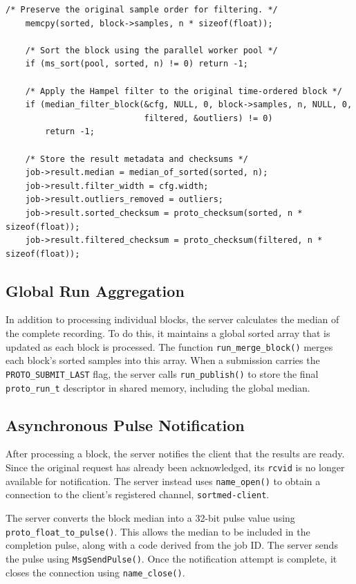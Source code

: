 \documentclass[12pt,a4paper,oneside]{report}
\begin{document}
\begin{lstlisting}[caption={Sorting, filtering, and preparing the block results}, label={lst:server-process}]
    /* Preserve the original sample order for filtering. */
    memcpy(sorted, block->samples, n * sizeof(float));

    /* Sort the block using the parallel worker pool */
    if (ms_sort(pool, sorted, n) != 0) return -1;

    /* Apply the Hampel filter to the original time-ordered block */
    if (median_filter_block(&cfg, NULL, 0, block->samples, n, NULL, 0,
                            filtered, &outliers) != 0)
        return -1;

    /* Store the result metadata and checksums */
    job->result.median = median_of_sorted(sorted, n);
    job->result.filter_width = cfg.width;
    job->result.outliers_removed = outliers;
    job->result.sorted_checksum = proto_checksum(sorted, n * sizeof(float));
    job->result.filtered_checksum = proto_checksum(filtered, n * sizeof(float));
\end{lstlisting}

\subsection{Global Run Aggregation}

In addition to processing individual blocks, the server calculates the median of the complete recording. To do this, it maintains a global sorted array that is updated as each block is processed. The function \texttt{run\_merge\_block()} merges each block's sorted samples into this array. When a submission carries the \texttt{PROTO\_SUBMIT\_LAST} flag, the server calls \texttt{run\_publish()} to store the final \texttt{proto\_run\_t} descriptor in shared memory, including the global median.

\subsection{Asynchronous Pulse Notification}

After processing a block, the server notifies the client that the results are ready. Since the original request has already been acknowledged, its \texttt{rcvid} is no longer available for notification. The server instead uses \texttt{name\_open()} to obtain a connection to the client's registered channel, \texttt{sortmed-client}.

The server converts the block median into a 32-bit pulse value using \texttt{proto\_float\_to\_pulse()}. This allows the median to be included in the completion pulse, along with a code derived from the job ID. The server sends the pulse using \texttt{MsgSendPulse()}. Once the notification attempt is complete, it closes the connection using \texttt{name\_close()}.
\end{document}
